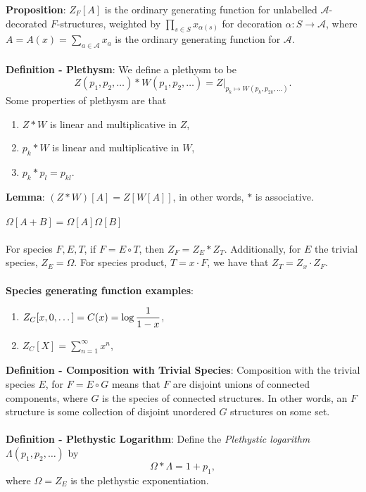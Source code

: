 \documentclass{article}
\begin{document}
\textbf{Proposition}: $Z_F[A]$ is the ordinary generating function for unlabelled $\mathcal{A}$-decorated $F$-structures, weighted by $\prod_{s \in S} x_{\alpha(s)}$ for decoration $\alpha: S \rightarrow \mathcal{A}$, where $A = A(x) = \sum_{a \in \mathcal{A}} x_a$ is the ordinary generating function for $\mathcal{A}$. \\ \\
\textbf{Definition - Plethysm}: We define a plethysm to be $$Z(p_1, p_2, \dots) \ast W(p_1, p_2, \dots) = Z|_{p_k \mapsto W(p_k, p_{2k}, \dots)}.$$ Some properties of plethysm are that \begin{enumerate}
    \item $Z \ast W$ is linear and multiplicative in $Z$,
    \item $p_k \ast W$ is linear and multiplicative in $W$,
    \item $p_k \ast p_l = p_{kl}$.
\end{enumerate} $ $ \\
\textbf{Lemma}: $(Z \ast W)[A] = Z[W[A]]$, in other words, $\ast$ is associative. \\ \\
$\Omega[A + B] = \Omega[A]\Omega[B]$ \\ \\
For species $F, E, T$, if $F = E \circ T$, then $Z_F = Z_E \ast Z_T$. Additionally, for $E$ the trivial species, $Z_E = \Omega$. For species product, $T = x \cdot F$, we have that $Z_T = Z_x \cdot Z_F$. \\ \\
\textbf{Species generating function examples}: \begin{enumerate}
    \item $Z_C[x, 0, \dots] = C(x) = \mathlarger{\log{\frac{1}{1 - x}}}$,
    \item $Z_C[X] = \sum_{n = 1}^\infty x^n$,
\end{enumerate} $ $ \\
\textbf{Definition - Composition with Trivial Species}: Composition with the trivial species $E$, for $F = E \circ G$ means that $F$ are disjoint unions of connected components, where $G$ is the species of connected structures. In other words, an $F$ structure is some collection of disjoint unordered $G$ structures on some set. \\ \\
\textbf{Definition - Plethystic Logarithm}: Define the \textit{Plethystic logarithm} $\Lambda(p_1, p_2, \dots)$ by $$\Omega \ast \Lambda = 1 + p_1,$$ where $\Omega = Z_E$ is the plethystic exponentiation. \\ \\
\end{document}
